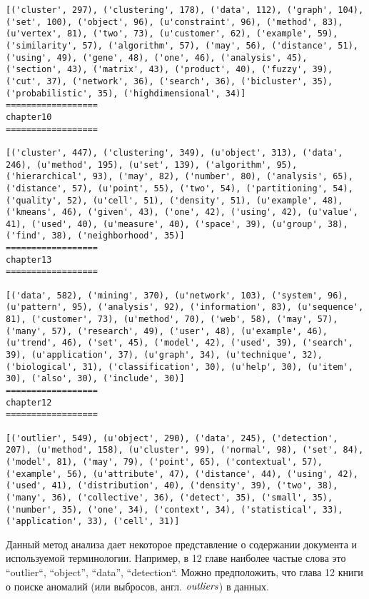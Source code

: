 \documentclass[12pt, a4paper] {article}
\begin{document}
\begin{lstlisting}[label=shell:freq_out]
[('cluster', 297), ('clustering', 178), ('data', 112), ('graph', 104), ('set', 100), ('object', 96), (u'constraint', 96), ('method', 83), (u'vertex', 81), ('two', 73), (u'customer', 62), ('example', 59), ('similarity', 57), ('algorithm', 57), ('may', 56), ('distance', 51), ('using', 49), ('gene', 48), ('one', 46), ('analysis', 45), ('section', 43), ('matrix', 43), ('product', 40), ('fuzzy', 39), ('cut', 37), ('network', 36), ('search', 36), ('bicluster', 35), ('probabilistic', 35), ('highdimensional', 34)]
==================
chapter10
==================

[('cluster', 447), ('clustering', 349), (u'object', 313), ('data', 246), (u'method', 195), (u'set', 139), ('algorithm', 95), ('hierarchical', 93), ('may', 82), ('number', 80), ('analysis', 65), ('distance', 57), (u'point', 55), ('two', 54), ('partitioning', 54), ('quality', 52), (u'cell', 51), ('density', 51), (u'example', 48), ('kmeans', 46), ('given', 43), ('one', 42), ('using', 42), (u'value', 41), ('used', 40), (u'measure', 40), ('space', 39), (u'group', 38), ('find', 38), ('neighborhood', 35)]
==================
chapter13
==================

[('data', 582), ('mining', 370), (u'network', 103), ('system', 96), (u'pattern', 95), ('analysis', 92), ('information', 83), (u'sequence', 81), ('customer', 73), (u'method', 70), ('web', 58), ('may', 57), ('many', 57), ('research', 49), ('user', 48), (u'example', 46), (u'trend', 46), ('set', 45), ('model', 42), ('used', 39), ('search', 39), (u'application', 37), (u'graph', 34), (u'technique', 32), ('biological', 31), ('classification', 30), (u'help', 30), (u'item', 30), ('also', 30), ('include', 30)]
==================
chapter12
==================

[('outlier', 549), (u'object', 290), ('data', 245), ('detection', 207), (u'method', 158), (u'cluster', 99), ('normal', 98), ('set', 84), ('model', 81), ('may', 79), ('point', 65), ('contextual', 57), ('example', 56), (u'attribute', 47), ('distance', 44), ('using', 42), ('used', 41), ('distribution', 40), ('density', 39), ('two', 38), ('many', 36), ('collective', 36), ('detect', 35), ('small', 35), ('number', 35), ('one', 34), ('context', 34), ('statistical', 33), ('application', 33), ('cell', 31)]
\end{lstlisting}


Данный метод анализа дает некоторое представление о содержании документа и используемой терминологии. Например, в 12 главе наиболее частые слова это ``outlier``, ``object'', ``data'', ``detection``. Можно предположить, что глава 12 книги о поиске  аномалий (или выбросов, англ. $\it outliers$) в данных.
\end{document}
